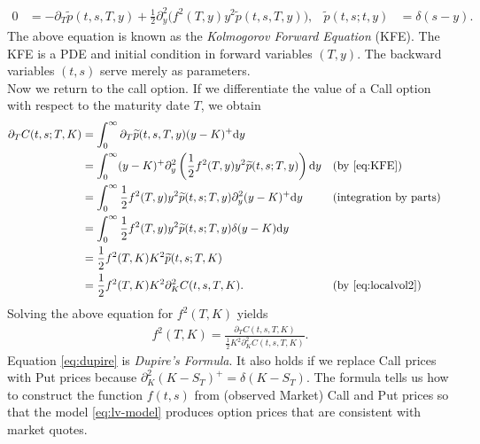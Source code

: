 \documentclass[12pt]{book}
\numberwithin{equation}{chapter}
\theoremstyle{plain}
\numberwithin{theorem}{section}
\theoremstyle{definition}
\numberwithin{exercise}{chapter}
\newcommand{\<}{\langle}
\renewcommand{\>}{\rangle}
\renewcommand{\(}{\left(}
\renewcommand{\)}{\right)}
\renewcommand{\[}{\left[}
\renewcommand{\]}{\right]}
\newcommand\del{\delta}
\renewcommand\d{\partial}
\newcommand\dd{\mathrm{d}}
\theoremstyle{definition}
\numberwithin{question}{section}
\newcommand\pt{\widetilde{p}}
\begin{document}
\begin{align} \label{eq:KFE}
 0 
	&= -\d_{T} \pt (t,s,T,y) + \frac{1}{2} \d_y^2 \Big( f^2(T,y) y^2  \pt(t,s,T,y) \Big), &
\pt (t,s;t,y) 
	&= \delta(s-y) .
\end{align}
The above equation is known as the \textit{Kolmogorov Forward Equation} (KFE).
The KFE is a PDE and initial condition in forward variables $(T,y)$.
The backward variables $(t,s)$ serve merely as parameters.
\\[0.5em]
Now we return to the call option.  If we differentiate the value of a Call option with respect to the maturity date $T$, we obtain
\begin{align}
\d_T C(t,s;T,K) 
	&= \int_0^\infty \d_T \pt(t,s,T,y) (y-K)^+ \dd y  \\
	&= \int_0^\infty (y-K)^+ \d_y^2 \( \frac{1}{2}f^2(T,y) y^2 \pt (t,s;T,y) \) \dd y &
	&\text{(by \eqref{eq:KFE})} \\
	&= \int_0^\infty \frac{1}{2} f^2(T,y) y^2 \pt (t,s;T,y) \d_y^2 (y-K)^+ \dd y &
	&\text{(integration by parts)}\\
	&= \int_0^\infty \frac{1}{2} f^2(T,y) y^2 \pt (t,s;T,y) \del(y-K) \dd y  \\
	&= \frac{1}{2} f^2(T,K) K^2 \pt (t,s;T,K)  \\
	&= \frac{1}{2} f^2(T,K) K^2 \d_K^2 C(t,s,T,K) . &
	&\text{(by \eqref{eq:localvol2})}
\end{align}
Solving the above equation for $f^2 (T,K)$ yields
\begin{align}
	f^2(T,K)= \frac{\d_T C(t,s,T,K)}{\tfrac{1}{2} K^2 \d_K^2 C(t,s,T,K)}. \label{eq:dupire}
\end{align}
Equation \eqref{eq:dupire} is \textit{Dupire's Formula}. It also holds if we replace Call prices with Put prices because $\d_K^2 (K-S_T)^+ = \delta(K-S_T)$.  The formula tells us how to construct the function $f(t,s)$ from (observed Market) Call and Put prices so that the model \eqref{eq:lv-model} produces option prices that are consistent with market quotes.
\end{document}
